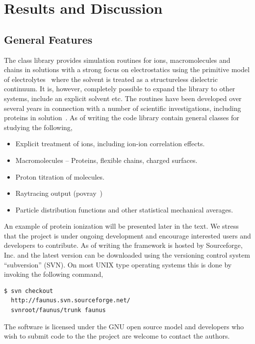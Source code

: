 \documentclass[10pt]{bmc_article}
\newenvironment{bmcformat}{\fussy\setboolean{publ}{true}}{\fussy}
\begin{document}
\begin{bmcformat}
 
\section*{Results and Discussion}

\subsection*{General Features}
The class library provides simulation routines for ions, macromolecules and chains in solutions with a strong focus on electrostatics using the primitive model of electrolytes~\cite{hill:86} where the solvent is treated as a structureless dielectric continuum. It is, however, completely possible to expand the library to other systems, include an explicit solvent etc. The routines have been developed over several years in connection with a number of scientific investigations, including proteins in solution~\cite{lund:05}. As of writing the code library contain general classes for studying the following,
\begin{itemize}
\item Explicit treatment of ions, including ion-ion correlation effects.
\item Macromolecules -- Proteins, flexible chains, charged surfaces.
\item Proton titration of molecules.
\item Raytracing output (povray~\cite{povray})
\item Particle distribution functions and other statistical mechanical averages.
\end{itemize}
An example of protein ionization will be presented later in the text.
We stress that the project is under ongoing development and encourage interested users and developers to contribute.
As of writing the framework is hosted by Sourceforge, Inc. and the latest version can be downloaded using the versioning control system ``subversion'' (SVN).
On most UNIX type operating systems this is done by invoking the following command,
\begin{verbatim}
$ svn checkout
  http://faunus.svn.sourceforge.net/
  svnroot/faunus/trunk faunus
\end{verbatim}

The software is licensed under the GNU open source model and developers who wish to submit code to the the project are welcome to contact the authors.



\end{bmcformat}
\end{document}
